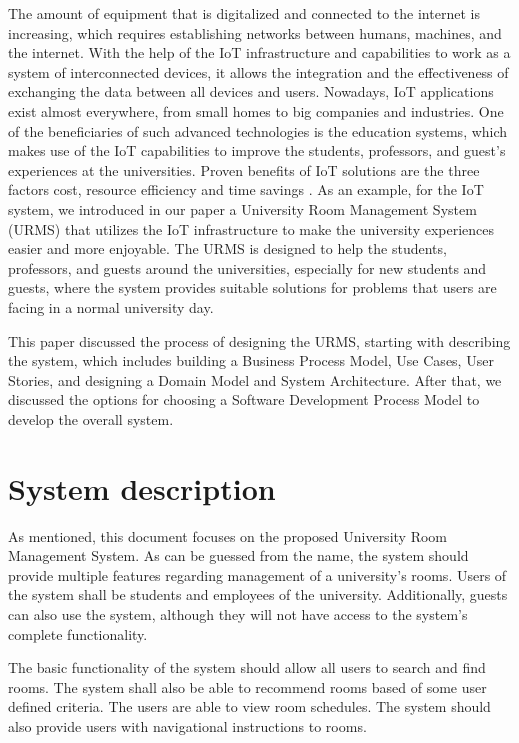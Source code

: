 \documentclass[article,onecolumn]{IEEEtran}
\begin{document}
The amount of equipment that is digitalized and connected to the internet is increasing, which requires establishing networks between humans, machines, and the internet. With the help of the IoT infrastructure and capabilities to work as a system of interconnected devices, it allows the integration and the effectiveness of exchanging the data between all devices and users. Nowadays, IoT applications exist almost everywhere, from small homes to big companies and industries. One of the beneficiaries of such advanced technologies is the education systems, which makes use of the IoT capabilities to improve the students, professors, and guest’s experiences at the universities. Proven benefits of IoT solutions are the three factors cost, resource efficiency and time savings \cite{a2}. As an example, for the IoT system, we introduced in our paper a University Room Management System (URMS) that utilizes the IoT infrastructure to make the university experiences easier and more enjoyable. The URMS is designed to help the students, professors, and guests around the universities, especially for new students and guests, where the system provides suitable solutions for problems that users are facing in a normal university day. 

This paper discussed the process of designing the URMS, starting with describing the system, which includes building a Business Process Model, Use Cases, User Stories, and designing a Domain Model and System Architecture. After that, we discussed the options for choosing a Software Development Process Model to develop the overall system. 


\section{System description}

As mentioned, this document focuses on the proposed University Room Management System.
As can be guessed from the name, the system should provide multiple features regarding management of a university's rooms.
Users of the system shall be students and employees of the university. Additionally, guests can also use the system, although they will not have access to the system's complete functionality.

The basic functionality of the system should allow all users to search and find rooms. The system shall also be able to recommend rooms based of some user defined criteria. The users are able to view room schedules.
The system should also provide users with navigational instructions to rooms.
\end{document}
